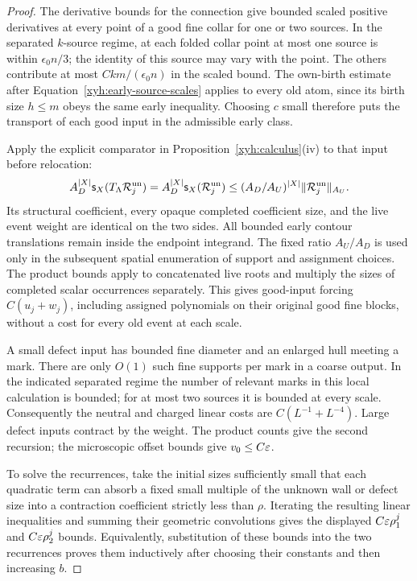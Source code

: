 \begin{proof}
The derivative bounds for the connection give bounded scaled positive
derivatives at every point of a good fine collar for one or two sources.
In the separated \(k\)-source regime, at each folded collar point at most one
source is within \(\epsilon_0n/3\); the identity of this source may vary
with the point. The others contribute at most
\(Ckm/(\epsilon_0n)\) in the scaled bound. The own-birth estimate after
Equation~\eqref{xyh:early-source-scales} applies to every old atom, since
its birth size \(h\le m\) obeys the same early inequality. Choosing
\(c\) small therefore puts the transport of each good input in the
admissible early class.

Apply the explicit comparator in Proposition~\ref{xyh:calculus}(iv) to
that input before relocation:
\[
 A_D^{|X|}\mathsf s_X(T_\Lambda\mathcal R_j^{\rm un})
 =A_D^{|X|}\mathsf s_X(\mathcal R_j^{\rm un})
 \le (A_D/A_U)^{|X|}\|\mathcal R_j^{\rm un}\|_{A_U}.
\]
Its structural coefficient, every opaque completed coefficient size,
and the live event weight are identical on the two sides. All bounded
early contour translations remain inside the endpoint integrand. The
fixed ratio \(A_U/A_D\) is used only in the subsequent spatial
enumeration of support and assignment choices. The product bounds apply
to concatenated live roots and multiply the sizes of completed scalar
occurrences separately. This gives good-input forcing
\(C(u_j+w_j)\), including assigned polynomials on their original good
fine blocks, without a cost for every old event at each scale.

A small defect input has bounded fine diameter and an enlarged hull
meeting a mark.  There are only \(O(1)\) such fine supports per
mark in a coarse output.  In the indicated separated regime the
number of relevant marks in this local calculation is bounded;
for at most two sources it is bounded at every scale.  Consequently
the neutral and charged linear costs are
\(C(L^{-1}+L^{-4})\).  Large defect inputs contract by the weight.
The product counts give the second recursion; the microscopic
offset bounds give \(v_0\le C\varepsilon\).

To solve the recurrences, take the initial sizes sufficiently small
that each quadratic term can absorb a fixed small multiple of the
unknown wall or defect size into a contraction coefficient strictly
less than \(\rho\).  Iterating the resulting linear inequalities
and summing their geometric convolutions gives the displayed
\(C\varepsilon\rho_1^j\) and \(C\varepsilon\rho_2^j\) bounds.  Equivalently,
substitution of these bounds into the two recurrences proves them
inductively after choosing their constants and then increasing \(b\).


\end{proof}
